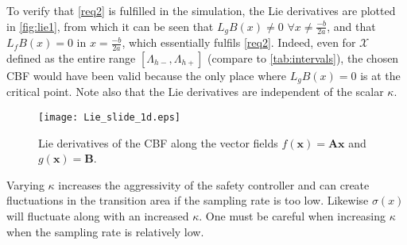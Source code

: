 To verify that \autoref{req2} is fulfilled in the simulation, the Lie derivatives are plotted in \autoref{fig:lie1}, from which it can be seen that $L_gB(x) \neq 0 \,\, \forall x \neq \frac{-b}{2a}$, and that $L_fB(x)=0$ in $x = \frac{-b}{2a}$, which essentially fulfils \autoref{req2}. Indeed, even for $\mathcal{X}$ defined as the entire range $[\Lambda_{h-},\Lambda_{h+}]$ (compare to \autoref{tab:intervals}), the chosen CBF would have been valid because the only place where $L_gB(x) = 0$ is at the critical point. Note also that the Lie derivatives are independent of the scalar $\kappa$.
\begin{figure}[H]
\hspace{-7mm}
		\texttt{[image: Lie\_slide\_1d.eps]}
	\caption{Lie derivatives of the CBF along the vector fields $f(\mathbf{x}) = \textbf{Ax}$ and $g(\mathbf{x})=\mathbf{B}$. %
		}
	\label{fig:lie1}
\end{figure}

Varying $\kappa$ increases the aggressivity of the safety controller and can create fluctuations in the transition area if the sampling rate is too low. Likewise $\sigma(x)$ will fluctuate along with an increased $\kappa$. One must be careful when increasing $\kappa$ when the sampling rate is relatively low. %


